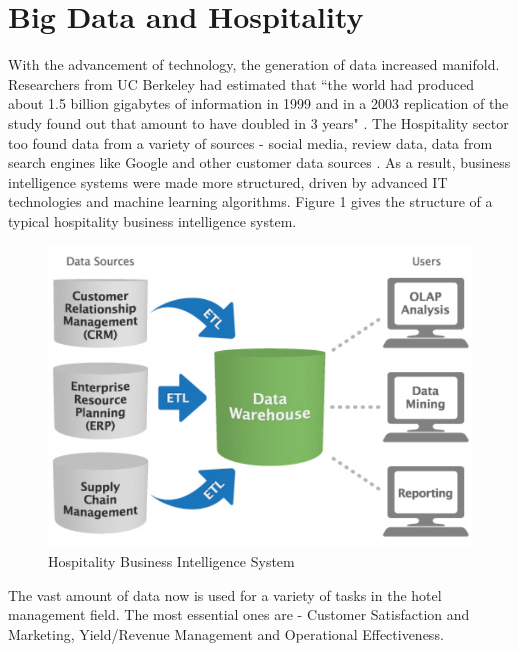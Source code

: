\documentclass[sigconf]{acmart}
\begin{document}
\section{Big Data and Hospitality}

With the advancement of technology, the generation of data increased manifold. Researchers from UC Berkeley had estimated that ``the world had produced about 1.5 billion gigabytes of information in 1999 and in a 2003 replication of the study found out that amount to have doubled in 3 years" \cite {gpress04}.
\newline The Hospitality sector too found data from a variety of sources - social media, review data, data from search engines like Google and other customer data sources \cite {bigdatapredictive02}. As a result, business intelligence systems were made more structured, driven by advanced IT technologies and machine learning algorithms. Figure 1 gives the structure of a typical hospitality business intelligence system.

\begin{figure}
	\includegraphics[width=\columnwidth]{images/business_intelligence_system.pdf}
	\caption{Hospitality Business Intelligence System \cite {businessintelligencetools08}}
\end{figure}

The vast amount of data now is used for a variety of tasks in the hotel management field. The most essential ones are - Customer Satisfaction and Marketing, Yield/Revenue Management and Operational Effectiveness.
\end{document}
